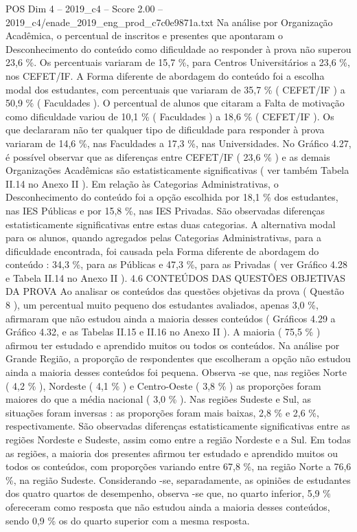 \begin{textsample}{POS Dim 4 – 2019\_c4 – Score 2.00 – 2019\_c4/enade\_2019\_eng\_prod\_c7c0e9871a.txt}
Na análise por Organização Acadêmica, o percentual de inscritos e presentes que apontaram o Desconhecimento do conteúdo como dificuldade ao responder à prova não superou 23,6 \%.
Os percentuais variaram de 15,7 \%, para Centros Universitários a 23,6 \%, nos CEFET/IF.
A Forma diferente de abordagem do conteúdo foi a escolha modal dos estudantes, com percentuais que variaram de 35,7 \% ( CEFET/IF ) a 50,9 \% ( Faculdades ).
O percentual de alunos que citaram a Falta de motivação como dificuldade variou de 10,1 \% ( Faculdades ) a 18,6 \% ( CEFET/IF ).
Os que declararam não ter qualquer tipo de dificuldade para responder à prova variaram de 14,6 \%, nas Faculdades a 17,3 \%, nas Universidades.
No Gráfico 4.27, é possível observar que as diferenças entre CEFET/IF ( 23,6 \% ) e as demais Organizações Acadêmicas são estatisticamente significativas ( ver também Tabela II.14 no Anexo II ).
Em relação às Categorias Administrativas, o Desconhecimento do conteúdo foi a opção escolhida por 18,1 \% dos estudantes, nas IES Públicas e por 15,8 \%, nas IES Privadas.
São observadas diferenças estatisticamente significativas entre estas duas categorias.
A alternativa modal para os alunos, quando agregados pelas Categorias Administrativas, para a dificuldade encontrada, foi causada pela Forma diferente de abordagem do conteúdo : 34,3 \%, para as Públicas e 47,3 \%, para as Privadas ( ver Gráfico 4.28 e Tabela II.14 no Anexo II ). 4.6 CONTEÚDOS DAS QUESTÕES OBJETIVAS DA PROVA Ao analisar os conteúdos das questões objetivas da prova ( Questão 8 ), um percentual muito pequeno dos estudantes avaliados, apenas 3,0 \%, afirmaram que não estudou ainda a maioria desses conteúdos ( Gráficos 4.29 a Gráfico 4.32, e as Tabelas II.15 e II.16 no Anexo II ).
A maioria ( 75,5 \% ) afirmou ter estudado e aprendido muitos ou todos os conteúdos.
Na análise por Grande Região, a proporção de respondentes que escolheram a opção não estudou ainda a maioria desses conteúdos foi pequena.
Observa -se que, nas regiões Norte ( 4,2 \% ), Nordeste ( 4,1 \% ) e Centro-Oeste ( 3,8 \% ) as proporções foram maiores do que a média nacional ( 3,0 \% ).
Nas regiões Sudeste e Sul, as situações foram inversas : as proporções foram mais baixas, 2,8 \% e 2,6 \%, respectivamente.
São observadas diferenças estatisticamente significativas entre as regiões Nordeste e Sudeste, assim como entre a região Nordeste e a Sul.
Em todas as regiões, a maioria dos presentes afirmou ter estudado e aprendido muitos ou todos os conteúdos, com proporções variando entre 67,8 \%, na região Norte a 76,6 \%, na região Sudeste.
Considerando -se, separadamente, as opiniões de estudantes dos quatro quartos de desempenho, observa -se que, no quarto inferior, 5,9 \% ofereceram como resposta que não estudou ainda a maioria desses conteúdos, sendo 0,9 \% os do quarto superior com a mesma resposta.

\end{textsample}
